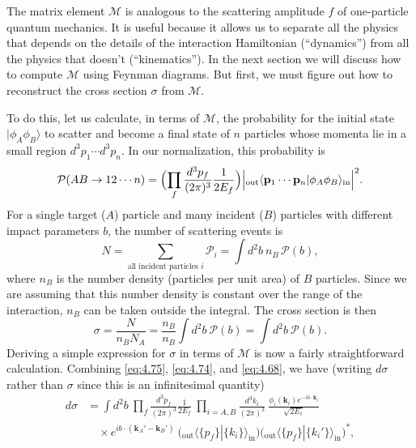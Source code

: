 The matrix element $\mathcal{M}$ is analogous to the scattering amplitude $f$
of one-particle quantum mechanics.  It is useful because it allows us to
separate all the physics that depends on the details of the interaction
Hamiltonian (``dynamics'') from all the physics that doesn't
(``kinematics'').  In the next section we will discuss how to compute
$\mathcal{M}$ using Feynman diagrams.  But first, we must figure out how to
reconstruct the cross section $\sigma$ from $\mathcal{M}$.

To do this, let us calculate, in terms of $\mathcal{M}$, the probability for
the initial state $|\phi_A\phi_B\rangle$ to scatter and become a final state
of $n$ particles whose momenta lie in a small region
$d^3p_1\cdots d^3p_n$.  In our normalization, this probability is
\begin{equation}
  \mathcal{P}(AB \to 12\cdots n)
    = \Bigl( \prod_f \frac{d^3p_f}{(2\pi)^3}\frac{1}{2E_f} \Bigr)
      \Bigl| {}_{\mathrm{out}}\langle \mathbf{p}_1\cdots\mathbf{p}_n
        |\phi_A\phi_B\rangle_{\mathrm{in}} \Bigr|^2 .
  \label{eq:4.74}
\end{equation}
For a single target ($A$) particle and many incident ($B$) particles with
different impact parameters $b$, the number of scattering events is
\begin{equation}
  N = \sum_{\text{all incident particles } i}
    \mathcal{P}_i = \int d^2b\ n_B\,\mathcal{P}(b),
\end{equation}
where $n_B$ is the number density (particles per unit area) of $B$ particles.
Since we are assuming that this number density is constant over the range of
the interaction, $n_B$ can be taken outside the integral.  The cross section
is then
\begin{equation}
  \sigma = \frac{N}{n_BN_A} = \frac{n_B}{n_B}\int d^2b\ \mathcal{P}(b)
    = \int d^2b\ \mathcal{P}(b) .
  \label{eq:4.75}
\end{equation}
Deriving a simple expression for $\sigma$ in terms of $\mathcal{M}$ is now a
fairly straightforward calculation.  Combining \eqref{eq:4.75},
\eqref{eq:4.74}, and \eqref{eq:4.68}, we have (writing $d\sigma$ rather than
$\sigma$ since this is an infinitesimal quantity)
\begin{equation}
  \begin{aligned}
    d\sigma &= \int d^2b\ \prod_f \frac{d^3p_f}{(2\pi)^3}\frac{1}{2E_f}\
      \prod_{i=A,B}\frac{d^3k_i}{(2\pi)^3}\ \frac{\phi_i(\mathbf{k}_i)
        e^{-ib\cdot\mathbf{k}_i}}{\sqrt{2E_i}}\\
    &\quad \times e^{ib\cdot(\mathbf{k}_A'-\mathbf{k}_B')}\
      \bigl( {}_{\mathrm{out}}\langle\{p_f\}|\{k_i\}\rangle_{\mathrm{in}} \bigr)
      \bigl( {}_{\mathrm{out}}\langle\{p_f\}|\{k_i'\}\rangle_{\mathrm{in}}
        \bigr)^{*} ,
  \end{aligned}
  \label{eq:4.76}
\end{equation}
